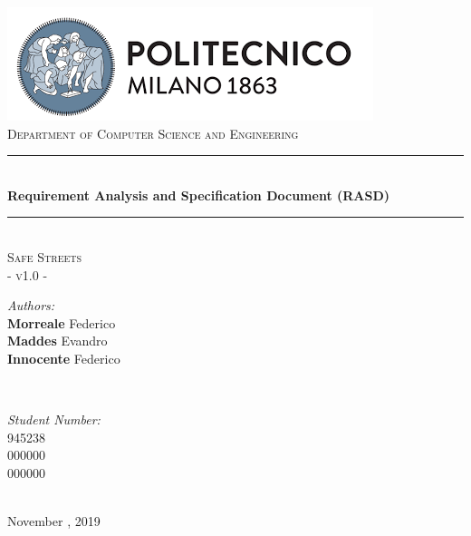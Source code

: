 \documentclass[a4paper, hidelinks, 12pt]{report}
\begin{document}
	\begin{titlepage}
		\centering
		\vspace*{0.7 cm}
		\includegraphics[scale = 0.85]{assets/polimi.png}\\[1.6 cm]
		\textsc{\large Department of Computer Science and Engineering}\\[1.8 cm]

		\rule{\linewidth}{0.2 mm} \\[0.4 cm]
		{ \huge \bfseries Requirement Analysis and Specification Document (RASD)}\\
		\rule{\linewidth}{0.2 mm} \\[1.5 cm]

		\textsc{\Large Safe Streets}\\[0.5 cm]
		\textsc{\large - v1.0 -}\\[1 cm]

		\begin{minipage}{0.4\textwidth}
			\begin{flushleft} \large
				\emph{Authors:}\\
				\textbf{Morreale} Federico \\
				\textbf{Maddes} Evandro \\
				\textbf{Innocente} Federico
			\end{flushleft}
		\end{minipage}~
		\begin{minipage}{0.4\textwidth}
			\begin{flushright} \large
				\emph{Student Number:} \\
				945238 \\
				000000 \\
				000000
			\end{flushright}
		\end{minipage}\\[2 cm]

		{\large November  , 2019}\\[2 cm]

		\vfill
	\end{titlepage}

	\tableofcontents
	\newpage
	\clearpage
	\setcounter{page}{1}
\end{document}
